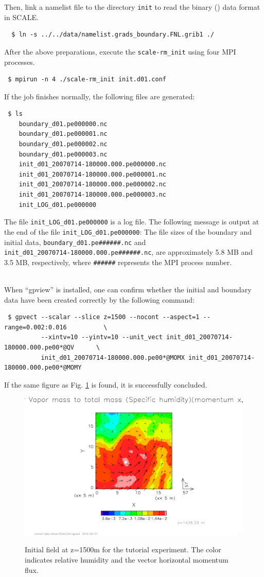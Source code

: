 Then, link a namelist file to the directory \verb|init| to read the binary (\grads) data format in SCALE.
\begin{verbatim}
  $ ln -s ../../data/namelist.grads_boundary.FNL.grib1 ./
\end{verbatim}
After the above preparations, execute the \verb|scale-rm_init| using four MPI processes.
\begin{verbatim}
 $ mpirun -n 4 ./scale-rm_init init.d01.conf
\end{verbatim}

If the job finishes normally, the following files are generated:
\begin{verbatim}
 $ ls
    boundary_d01.pe000000.nc
    boundary_d01.pe000001.nc
    boundary_d01.pe000002.nc
    boundary_d01.pe000003.nc
    init_d01_20070714-180000.000.pe000000.nc
    init_d01_20070714-180000.000.pe000001.nc
    init_d01_20070714-180000.000.pe000002.nc
    init_d01_20070714-180000.000.pe000003.nc
    init_LOG_d01.pe000000
\end{verbatim}
The file \verb|init_LOG_d01.pe000000| is a log file.  The following message is output at the end of the file \verb|init_LOG_d01.pe000000|:
The file sizes of the boundary and initial data, \verb|boundary_d01.pe######.nc| and \\
\verb|init_d01_20070714-180000.000.pe######.nc|, are approximately 5.8 MB and 3.5 MB, respectively,  where \verb|######| represents the MPI process number.

\vspace{1cm}
 \hrulefill \\
When ``gpview'' is installed,  one can confirm whether the initial and boundary data have been created correctly  by the following command:
\begin{verbatim}
 $ gpvect --scalar --slice z=1500 --nocont --aspect=1 --range=0.002:0.016          \
          --xintv=10 --yintv=10 --unit_vect init_d01_20070714-180000.000.pe00*@QV      \
          init_d01_20070714-180000.000.pe00*@MOMX init_d01_20070714-180000.000.pe00*@MOMY
\end{verbatim}
If the same figure as Fig. \ref{fig:init} is found, it is successfully concluded.

\begin{figure}[h]
\begin{center}
  \includegraphics[width=0.9\hsize]{./figure/real_init_qv-momxy.eps}\\
  \caption{Initial field at z=1500m for the tutorial experiment. 
    The color indicates relative humidity and the vector horizontal momentum flux.}
  \label{fig:init}
\end{center}
\end{figure}
